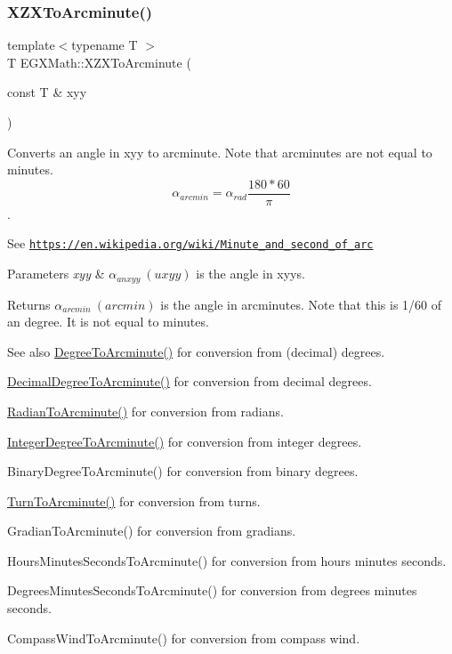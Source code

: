 \subsubsection{\texorpdfstring{X\+Z\+X\+To\+Arcminute()}{XZXToArcminute()}}
{\footnotesize\ttfamily template$<$typename T $>$ \\
T E\+G\+X\+Math\+::\+X\+Z\+X\+To\+Arcminute (\begin{DoxyParamCaption}\item[{const T \&}]{xyy }\end{DoxyParamCaption})}



Converts an angle in xyy to arcminute. Note that arcminutes are not equal to minutes. \[\alpha_{arcmin}=\alpha_{rad}\frac{180 * 60}{\pi}\]. 

See \href{https://en.wikipedia.org/wiki/Minute_and_second_of_arc}{\tt https\+://en.\+wikipedia.\+org/wiki/\+Minute\+\_\+and\+\_\+second\+\_\+of\+\_\+arc} 
\begin{DoxyParams}{Parameters}
{\em xyy} & $\alpha_{anxyy}\ (uxyy)$ is the angle in xyys. \\
\hline
\end{DoxyParams}
\begin{DoxyReturn}{Returns}
$\alpha_{arcmin}\ (arcmin)$ is the angle in arcminutes. Note that this is 1/60 of an degree. It is not equal to minutes. 
\end{DoxyReturn}
\begin{DoxySeeAlso}{See also}
\mbox{\hyperlink{group___e_g_x_math-_angle_conversions-_degree_ga8abf327dc5f52907b2c881999e9cc43e}{Degree\+To\+Arcminute()}} for conversion from (decimal) degrees. 

\mbox{\hyperlink{group___e_g_x_math-_angle_conversions-_decimal_degree_ga6b6ea6e45d2a13f556824ca419cc9fbd}{Decimal\+Degree\+To\+Arcminute()}} for conversion from decimal degrees. 

\mbox{\hyperlink{group___e_g_x_math-_angle_conversions-_radian_ga722e3b8e78540a6b3942b73b64aeb8d2}{Radian\+To\+Arcminute()}} for conversion from radians. 

\mbox{\hyperlink{group___e_g_x_math-_angle_conversions-_integer_degree_ga78b014e7649d666a3647c467e64e4fe8}{Integer\+Degree\+To\+Arcminute()}} for conversion from integer degrees. 

Binary\+Degree\+To\+Arcminute() for conversion from binary degrees. 

\mbox{\hyperlink{group___e_g_x_math-_angle_conversions-_turn_ga72cda928d9043c7d82097b1a7920769e}{Turn\+To\+Arcminute()}} for conversion from turns. 

Gradian\+To\+Arcminute() for conversion from gradians. 

Hours\+Minutes\+Seconds\+To\+Arcminute() for conversion from hours minutes seconds. 

Degrees\+Minutes\+Seconds\+To\+Arcminute() for conversion from degrees minutes seconds. 

Compass\+Wind\+To\+Arcminute() for conversion from compass wind. 
\end{DoxySeeAlso}
